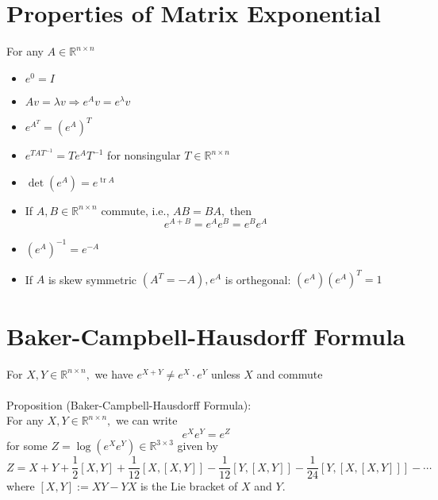 \documentclass[10pt,a4paper,oneside]{article}
\begin{document}
\section{Properties of Matrix Exponential}
For any $A\in\mathbb{R}^{n\times n}$
\begin{itemize}
\item $e^{0}=I$
\item $A v=\lambda v \Rightarrow e^{A} v=e^{\lambda} v$
\item $e^{A^{T}}=\left(e^{A}\right)^{T}$
\item $e^{T A T^{-1}}=T e^{A} T^{-1}$ for nonsingular $T \in \mathbb{R}^{n \times n}$
\item $\operatorname{det}\left(e^{A}\right)=e^{\operatorname{tr} A}$
\item If $A, B \in \mathbb{R}^{n \times n}$ commute, i.e., $A B=B A,$ then
\[
e^{A+B}=e^{A} e^{B}=e^{B} e^{A}
\]
\item $\left(e^{A}\right)^{-1}=e^{-A}$
\item If $A$ is skew symmetric $\left(A^{T}=-A\right), e^{A}$ is orthegonal: $\left(e^{A}\right)\left(e^{A}\right)^{T}=1$
\end{itemize}
\section{Baker-Campbell-Hausdorff Formula}
For $X, Y \in \mathbb{R}^{n \times n},$ we have $e^{X+Y} \neq e^{X} \cdot e^{Y}$ unless $X$ and  commute\\
\\
Proposition (Baker-Campbell-Hausdorff Formula):\\
For any $X, Y \in \mathbb{R}^{n \times n},$ we can write
\[
e^{X} e^{Y}=e^{Z}
\]
for some $Z=\log \left(e^{X} e^{Y}\right) \in \mathbb{R}^{3 \times 3}$ given by
\[
Z=X+Y+\frac{1}{2}[X, Y]+\frac{1}{12}[X,[X, Y]]-\frac{1}{12}[Y,[X, Y]]-\frac{1}{24}[Y,[X,[X, Y]]]-\cdots
\]
where $[X, Y] :=X Y-Y X$ is the Lie bracket of $X$ and $Y$.
\end{document}
